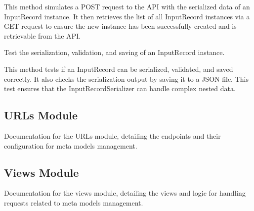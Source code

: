 \documentclass[letterpaper,10pt,english]{sphinxmanual}
\begin{document}
\begin{fulllineitems}
\begin{fulllineitems}
\sphinxAtStartPar
This method simulates a POST request to the API with the serialized data of an InputRecord instance.
It then retrieves the list of all InputRecord instances via a GET request to ensure the new instance
has been successfully created and is retrievable from the API.

\end{fulllineitems}


\begin{fulllineitems}
\label{\detokenize{source/meta_models_management:meta_models_management.tests.InputRecordSerializerTestCase.test_save_and_retrieve_record}}
\pysigstartsignatures
{}
\pysigstopsignatures
\sphinxAtStartPar
Test the serialization, validation, and saving of an InputRecord instance.

\sphinxAtStartPar
This method tests if an InputRecord can be serialized, validated, and saved correctly.
It also checks the serialization output by saving it to a JSON file.
This test ensures that the InputRecordSerializer can handle complex nested data.

\end{fulllineitems}


\end{fulllineitems}



\subsection{URLs Module}
\label{\detokenize{source/meta_models_management:urls-module}}
\sphinxAtStartPar
Documentation for the URLs module, detailing the endpoints and their configuration for meta models management.

\subsection{Views Module}
\label{\detokenize{source/meta_models_management:views-module}}\label{\detokenize{source/meta_models_management:module-meta_models_management.urls}}
\sphinxAtStartPar
Documentation for the views module, detailing the views and logic for handling requests related to meta models management.
\label{\detokenize{source/meta_models_management:module-meta_models_management.views}}
\end{document}

